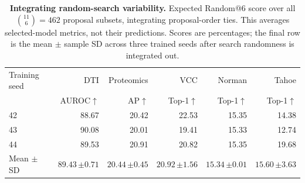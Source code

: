 \begin{table}[!ht]
\centering
\caption{\textbf{Integrating random-search variability.} Expected Random@6 score over all $\binom{11}{6}=462$ proposal subsets, integrating proposal-order ties. This averages selected-model metrics, not their predictions. Scores are percentages; the final row is the mean $\pm$ sample SD across three trained seeds after search randomness is integrated out.}
\label{tab:single-lab-search-expectation}
\small
\setlength{\tabcolsep}{3pt}
\renewcommand{\arraystretch}{1.13}
\begin{tabular*}{\textwidth}{@{\extracolsep{\fill}}lrrrrr@{}}
\toprule
Training seed & DTI & Proteomics & VCC & Norman & Tahoe \\
 & AUROC$\uparrow$ & AP$\uparrow$ & Top-1$\uparrow$ & Top-1$\uparrow$ & Top-1$\uparrow$ \\
\midrule
42 & 88.67 & 20.42 & 22.53 & 15.35 & 14.38 \\
43 & 90.08 & 20.01 & 19.41 & 15.33 & 12.74 \\
44 & 89.53 & 20.91 & 20.82 & 15.35 & 19.68 \\
\midrule
Mean $\pm$ SD & $89.43\,{\scriptstyle\pm0.71}$ & $20.44\,{\scriptstyle\pm0.45}$ & $20.92\,{\scriptstyle\pm1.56}$ & $15.34\,{\scriptstyle\pm0.01}$ & $15.60\,{\scriptstyle\pm3.63}$ \\
\bottomrule
\end{tabular*}
\end{table}
